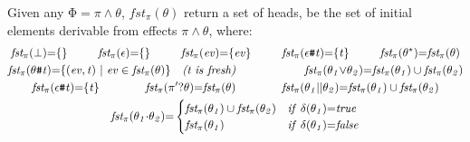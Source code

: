 \documentclass[acmsmall,10pt,review]{acmart}
\newcommand{\es}{\theta}
\newcommand{\ev}{ev}
\newcommand{\effect}{{\ensuremath{\mathrm{\Phi}}}}
\newcommand{\seq}{\cdot}
\newcommand{\code}[1]{{\tt{\ensuremath{\m{#1}}}}}
\newcommand{\empt}{\textcolor{black}{\ensuremath{\epsilon}}}
\newcommand{\bott}{\textcolor{black}{\ensuremath{\bot}}}
\newcommand{\m}{\mathit}
\newcommand{\mysharp}{{\mathrel{\texttt{\#}}}}
\begin{document}
{\begin{definition}[First]\label{First}
  Given any \code{\effect {=} \pi \wedge \es},
  \code{fst_{{\pi}}(\es)} return a set of heads, be the set of initial elements   
  derivable from effects \code{\pi \wedge \es}, where: 
    { 
   \begin{gather*} 
  \code{fst_{{\pi}}( \bott) {=} \{\} } \qquad\ \ 
  \code{fst_{{\pi}}(\empt) {=}  \{\} } \qquad\ \ 
  \code{fst_{{\pi}}( \ev) {=} \{ \ev \}  }
  \qquad\ \ 
  \code{fst_{{\pi}}(  \epsilon \mysharp  t) {=}  \{ t \}}
  \qquad\ \ 
  \code{fst_{{\pi}}( {\es^\star} ) {=} fst_{{\pi}}({ \es})}
   \\
   \code{fst_{{\pi}}(\es \mysharp  t) {=}  \{(\ev, t) \ | \ \ev \in fst_{\pi}(\es) \}} 
   \ \ \  \emph{(t\ is\ fresh)}
  \qquad\quad 
  \qquad\quad
  \code{fst_{{\pi}}(  \es_1 {\vee} \es_2) {=} fst_{{\pi}}(  \es_1) \cup fst_{{\pi}}(  \es_2)  }  \\
  \code{fst_{{\pi}}(\epsilon \mysharp  t) {=}  \{t\}} 
   \qquad \qquad
  \code{fst_{{\pi}}( \pi^\prime? \es ) {=} fst_{\pi}(\es)  }
      \qquad\qquad
     \code{fst_{{\pi}}(  \es_1 {||} \es_2) {=} fst_{{\pi}}(  \es_1) \cup fst_{{\pi}}(  \es_2)  }   
     \\
  {
  \code{fst_{{\pi}}(\es_1 {\seq} \es_2) {=} } 
  \begin{cases}
        \code{\code{fst_{{\pi}}(  \es_1)} \cup \code{fst_{{\pi}}(  \es_2)} } & \code{ if\ \delta(\es_1) {=} true}\\
        \code{\code{fst_{{\pi}}(  \es_1)}} & \code{  if\ \delta(\es_1) {=} false}
      \end{cases} 
      }  
  \end{gather*}
  }
\end{definition}

}
\end{document}
